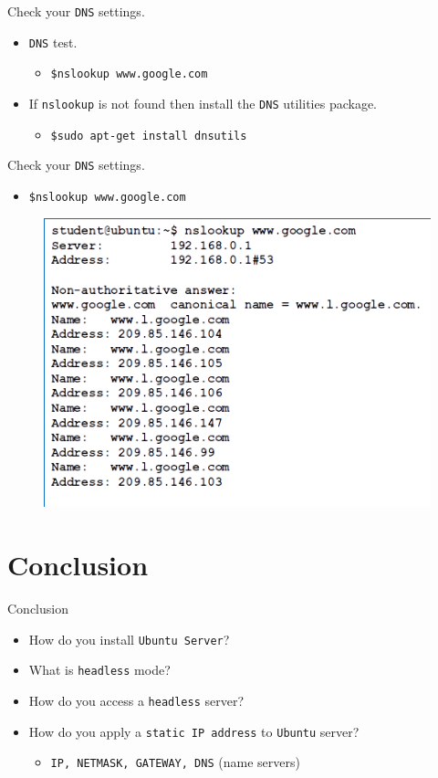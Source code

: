 \documentclass{beamer}
\begin{document}
\begin{frame}{Check your \texttt{DNS} settings.}
  \begin{itemize}
    \item \texttt{DNS} test.
    \begin{itemize}
      \item \texttt{\$nslookup www.google.com}
    \end{itemize}
    \item If \texttt{nslookup} is not found then install the \texttt{DNS} utilities package.
    \begin{itemize}
      \item \texttt{\$sudo apt-get install dnsutils}
    \end{itemize}
  \end{itemize}
\end{frame}

\begin{frame}{Check your \texttt{DNS} settings.}
  \begin{itemize}
    \item \texttt{\$nslookup www.google.com}
  \end{itemize}
  \begin{figure}
    \begin{center}
      \includegraphics[width=0.8\linewidth]{nslookup.png}
    \end{center}
  \end{figure}
\end{frame}


\section*{Conclusion}
\begin{frame}{Conclusion}
  \begin{itemize}
    \item How do you install \texttt{Ubuntu Server}?
    \item What is \texttt{headless} mode?
    \item How do you access a \texttt{headless} server?
    \item How do you apply a \texttt{static IP address} to \texttt{Ubuntu} server?
    \begin{itemize}
      \item \texttt{IP, NETMASK, GATEWAY, DNS} (name servers)
    \end{itemize}
  \end{itemize}
\end{frame}
\end{document}
